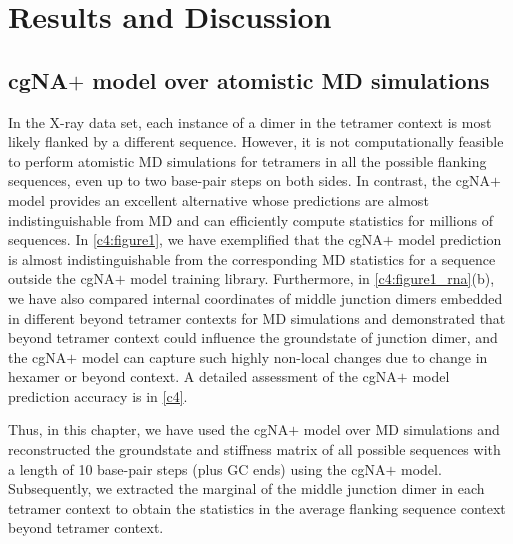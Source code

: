 \section{Results and Discussion}

\subsection{cgNA$+$ model over atomistic MD simulations}
In the X-ray data set, each instance of a dimer in the tetramer context is most likely flanked by a different sequence.
However, it is not computationally feasible to perform atomistic MD simulations for tetramers in all the possible flanking sequences, even up to two base-pair steps on both sides.
In contrast, the cgNA$+$ model provides an excellent alternative whose predictions are almost indistinguishable from MD and can efficiently compute statistics for millions of sequences. 
In \cref{c4:figure1}, we have exemplified that the cgNA$+$ model prediction is almost indistinguishable from the corresponding MD statistics for a sequence outside the cgNA$+$ model training library.
Furthermore, in \cref{c4:figure1_rna}(b), we have also compared internal coordinates of middle junction dimers embedded in different beyond tetramer contexts for MD simulations and demonstrated that beyond tetramer context could influence the groundstate of junction dimer, and the cgNA$+$ model can capture such highly non-local changes due to change in hexamer or beyond context.
A detailed assessment of the cgNA$+$ model prediction accuracy is in \cref{c4}. 

Thus, in this chapter, we have used the cgNA$+$ model over MD simulations and reconstructed the groundstate and stiffness matrix of all possible sequences with a length of 10 base-pair steps (plus GC ends) using the cgNA$+$ model.
Subsequently, we extracted the marginal of the middle junction dimer in each tetramer context to obtain the statistics in the average flanking sequence context beyond tetramer context.

